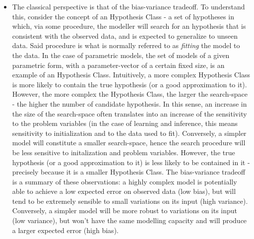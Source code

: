 \begin{itemize}
    \item The classical perspective is that of the bias-variance tradeoff. To
        understand this, consider the concept of an Hypothesis Class - a set
        of hypotheses in which, via some procedure, the modeller will search
        for an hypothesis that is consistent with the observed data, and is
        expected to generalize to unseen data. Said procedure is what is normally
        referred to as \emph{fitting} the model to the data. In the case of
        parametric models, the set of models of a given parametric form, with
        a parameter-vector of a certain fixed size, is an example of an Hypothesis
        Class. Intuitively, a more complex Hypothesis Class is more likely to
        contain the true hypothesis (or a good approximation to it). However,
        the more complex the Hypothesis Class, the larger the search-space -
        the higher the number of candidate hypothesis. In this sense, an increase
        in the size of the search-space often translates into an increase of the
        sensitivity to the problem variables (in the case of learning and inference,
        this means sensitivity to initialization and to the data used to fit).
        Conversely, a simpler model will constitute a smaller search-space, hence
        the search procedure will be less sensitive to initalization and problem
        variables. However, the true hypothesis (or a good approximation to it)
        is less likely to be contained in it - precisely because it is a smaller
        Hypothesis Class. The bias-variance tradeoff is a summary of these observations:
        a highly complex model is potentially able to achieve a low expected error
        on observed data (low bias), but will tend to be extremely sensible to small
        variations on its input (high variance). Conversely, a simpler model will
        be more robust to variations on its input (low variance), but won't have the same
        modelling capacity and will produce a larger expected error (high bias). %

\end{itemize}
